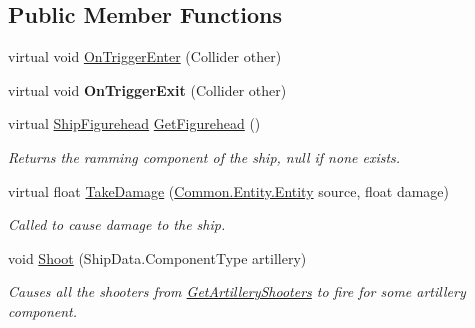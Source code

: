 \subsection*{Public Member Functions}
\begin{DoxyCompactItemize}
\item 
\hypertarget{class_skyrates_1_1_client_1_1_entity_1_1_entity_ship_a8d087e5b03b8573f56e3da6fd15720a0}{virtual void \hyperlink{class_skyrates_1_1_client_1_1_entity_1_1_entity_ship_a8d087e5b03b8573f56e3da6fd15720a0}{On\-Trigger\-Enter} (Collider other)}\label{class_skyrates_1_1_client_1_1_entity_1_1_entity_ship_a8d087e5b03b8573f56e3da6fd15720a0}

\item 
\hypertarget{class_skyrates_1_1_client_1_1_entity_1_1_entity_ship_aec4ab41b8d13d876b9b2716bb45f8d72}{virtual void {\bfseries On\-Trigger\-Exit} (Collider other)}\label{class_skyrates_1_1_client_1_1_entity_1_1_entity_ship_aec4ab41b8d13d876b9b2716bb45f8d72}

\item 
virtual \hyperlink{class_skyrates_1_1_client_1_1_ship_1_1_ship_figurehead}{Ship\-Figurehead} \hyperlink{class_skyrates_1_1_client_1_1_entity_1_1_entity_ship_a08f8bb2a31e9f5cdc7a381d8c56670e3}{Get\-Figurehead} ()
\begin{DoxyCompactList}\small\item\em Returns the ramming component of the ship, null if none exists. \end{DoxyCompactList}\item 
virtual float \hyperlink{class_skyrates_1_1_client_1_1_entity_1_1_entity_ship_abad1336581d008dcdd90f400c91f6089}{Take\-Damage} (\hyperlink{class_skyrates_1_1_common_1_1_entity_1_1_entity}{Common.\-Entity.\-Entity} source, float damage)
\begin{DoxyCompactList}\small\item\em Called to cause damage to the ship. \end{DoxyCompactList}\item 
void \hyperlink{class_skyrates_1_1_client_1_1_entity_1_1_entity_ship_ad039d8b72251304fa50236d120bd6a46}{Shoot} (Ship\-Data.\-Component\-Type artillery)
\begin{DoxyCompactList}\small\item\em Causes all the shooters from \hyperlink{class_skyrates_1_1_client_1_1_entity_1_1_entity_ship_ae647437ac479d1758cf5ad5a80c4f89c}{Get\-Artillery\-Shooters} to fire for some artillery component. \end{DoxyCompactList}\end{DoxyCompactItemize}
